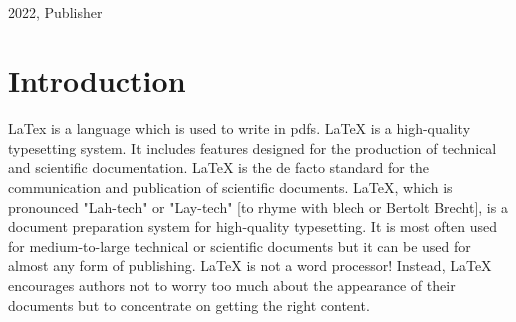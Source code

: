 \documentclass[A4 paper,openany]{book}  %
\begin{document}
\begin{titlepage}
{\begin{verbatim}
                                                                                                                                                                                                              
                                                                                                                                                              
                                                                                                                                                                                                                                                                     
                                                                                                                                                                                                                                                                            
                                                                                                      
                                                                                                      
        \end{verbatim}
    }
    \vfill
    {\small{2022, Publisher}}
\end{titlepage}


\pagecolor{foo}
\color{black}
\newpage
\tableofcontents
\newpage
\listoffigures
\newpage
\listoftables
\newpage

\part{Introduction}
LaTex is a language which is used to write in pdfs. LaTeX is a high-quality typesetting system.
It includes features designed for the production of technical and scientific documentation.
LaTeX is the de facto standard for the communication and publication of scientific documents.
LaTeX, which is pronounced "Lah-tech" or "Lay-tech" [to rhyme with blech or Bertolt Brecht], is a document preparation system for high-quality typesetting.
It is most often used for medium-to-large technical or scientific documents but it can be used for almost any form of publishing.
LaTeX is not a word processor! Instead, LaTeX encourages authors not to worry too much about the appearance of their documents but to concentrate on getting the right content.
\end{document}
